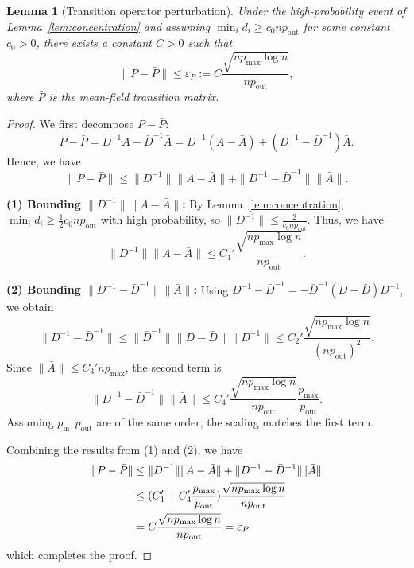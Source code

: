 \documentclass[11pt,english]{article}
\newtheorem{lemma}{Lemma}
\begin{document}
\begin{lemma}[Transition operator perturbation]
\label{lem:transition}
Under the high-probability event of Lemma~\ref{lem:concentration} and assuming $\min_i d_i \ge c_0 n p_{\mathrm{out}}$ for some constant $c_0>0$,
there exists a constant $C>0$ such that
\begin{equation}
    \label{eq:epsinf}
    \|P-\bar P\| \le \varepsilon_P := C\frac{\sqrt{n p_{\max}\log n}}{n p_{\mathrm{out}}},
\end{equation}
where $\bar P$ is the mean-field transition matrix.
\end{lemma}


\begin{proof}
We first decompose $P - \bar P$:
\[
P - \bar P = D^{-1}A - \bar D^{-1}\bar A = D^{-1}(A-\bar A) + (D^{-1}-\bar D^{-1})\bar A.
\]
Hence, we have
\[
\|P-\bar P\| \le \|D^{-1}\|\|A-\bar A\| + \|D^{-1}-\bar D^{-1}\|\|\bar A\|.
\]

\noindent
\textbf{(1) Bounding $\|D^{-1}\|\|A-\bar A\|$:}  
By Lemma~\ref{lem:concentration}, $\min_i d_i \ge \frac{1}{2}c_0 n p_{\mathrm{out}}$ with high probability, so $\|D^{-1}\|\le \frac{2}{c_0 n p_{\mathrm{out}}}$.  Thus, we have
\[
\|D^{-1}\|\|A-\bar A\|
\le C_1'\frac{\sqrt{n p_{\max}\log n}}{n p_{\mathrm{out}}}.
\]

\noindent
\textbf{(2) Bounding $\|D^{-1}-\bar D^{-1}\|\|\bar A\|$:}  Using $D^{-1}-\bar D^{-1} = -\bar D^{-1}(D-\bar D)D^{-1}$, we obtain
\[
\|D^{-1}-\bar D^{-1}\|
\le \|\bar D^{-1}\|\|D-\bar D\|\|D^{-1}\|
\le C_2'\frac{\sqrt{n p_{\max}\log n}}{(n p_{\mathrm{out}})^2}.
\]
Since $\|\bar A\|\le C_3' n p_{\max}$, the second term is
\[
\|D^{-1}-\bar D^{-1}\|\|\bar A\|
\le C_4'\frac{\sqrt{n p_{\max}\log n}}{n p_{\mathrm{out}}}
\frac{p_{\max}}{p_{\mathrm{out}}}.
\]
Assuming $p_{\mathrm{in}},p_{\mathrm{out}}$ are of the same order,  the scaling matches the first term. 

\noindent Combining the results from (1) and (2), we have 
\begin{align}
    \notag \|P-\bar P\| &\le \|D^{-1}\|\|A-\bar A\| + \|D^{-1}-\bar D^{-1}\|\|\bar A\| \\
    \notag &\le (C_1' +C_4'\frac{p_{\max}}{p_{\mathrm{out}}}) \frac{\sqrt{n p_{\max}\log n}}{n p_{\mathrm{out}}}  \\
    \notag &= C\frac{\sqrt{n p_{\max}\log n}}{n p_{\mathrm{out}}} =  \varepsilon_P
\end{align}
which completes the proof.
\end{proof}
\end{document}
